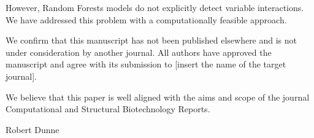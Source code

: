 \documentclass{article}
\begin{document}
However, Random Forests models do not explicitly detect variable interactions. We have addressed this problem with a
computationally feasible approach.

We confirm that this manuscript has not been published elsewhere and is not under consideration by another journal.
All authors have approved the manuscript and agree with its submission to [insert the name of the target journal].

We believe that this paper is well aligned with the aims and scope of the journal Computational and Structural
Biotechnology Reports.


Robert Dunne
\end{document}
